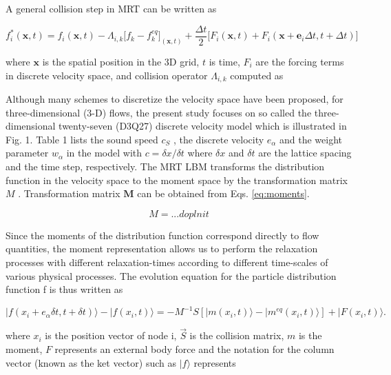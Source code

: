 A general collision step in MRT can be written as \cite{feiModelingRealisticMultiphase2019}

\begin{equation}
	\label{eq:mrt-collision}
	f_i^{*} (\bm{x},t) = f_i (\bm{x},t)-\Lambda_{i,k}\big[f_k - f_k^{eq}\big]_{(\bm{x},t)} +\frac{\Delta t}{2} \big[ F_i (\bm{x},t) +  F_i (\bm{x}+\bm{e}_i\Delta t,t+\Delta t) \big]
\end{equation}

where $\bm{x}$ is the spatial position in the 3D grid, $t$ is time, $F_i$ are the forcing terms in discrete velocity space, and collision operator $\Lambda_{i,k}$ computed as \cite{feiModelingRealisticMultiphase2019}

Although many schemes to discretize the velocity space have been proposed, for three-dimensional (3-D) flows, the present study focuses on so called the three- dimensional twenty-seven (D3Q27) discrete velocity model which is illustrated in Fig. 1. Table 1 lists the sound speed $c_S$ , the discrete velocity $e_\alpha$ and the weight parameter $w_\alpha$ in the model with $c = \delta x / \delta t$ where $\delta x$ and $\delta t$ are the lattice spacing and the time step, respectively. The MRT LBM transforms the distribution function in the velocity space to the moment space by the transformation matrix $M$ . Transformation matrix $\bm{M}$ can be obtained from Eqs. \ref{eq:moments}.

\begin{equation}
	\label{eq:moments}
	M = ... doplnit
\end{equation}

Since the moments of the distribution function correspond directly to flow quantities, the moment representation allows us to perform the relaxation processes with different relaxation-times according to different time-scales of various physical processes. The evolution equation for the particle distribution function f is thus written as

\begin{equation}
	|f (x_i +e_\alpha \delta t,t+ \delta t)\rangle-|f (x_i,t)\rangle=-M^{-1} S [|m(x_i,t)\rangle - |m^{eq} (x_i,t)\rangle]+|F(x_i,t)\rangle.
\end{equation}

where $x_i$ is the position vector of node i, $\vec{S}$ is the collision matrix, $m$ is the moment, $F$ represents an external body force and the notation for the column vector (known as the ket vector) such as $|f \rangle$ represents

